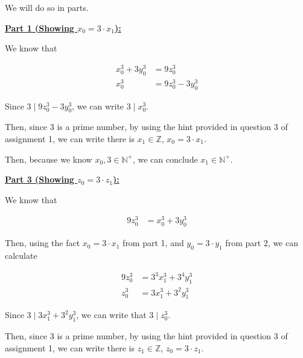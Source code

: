 \documentclass[12pt]{article}
\begin{document}
\begin{mdframed}
\begin{enumerate}[1.]
\begin{mdframed}
        \bigskip

        We will do so in parts.

        \bigskip

        \underline{\textbf{Part 1 (Showing $x_0 = 3 \cdot x_1$):}}

        \bigskip

        We know that

        \begin{align}
            x_0^3 + 3y_0^3 &= 9z_0^3\\
            x_0^3 &= 9z_0^3 - 3y_0^3
        \end{align}

        \bigskip

        Since $3 \mid 9z_0^3 - 3y_0^3$, we can write $3 \mid x_0^3$.

        \bigskip

        Then, since 3 is a prime number, by using the hint provided in question 3
        of assignment 1, we can write there is $x_1 \in \mathbb{Z}$, $x_0 = 3 \cdot x_1$.

        \bigskip

        Then, because we know $x_0, 3 \in \mathbb{N}^+$, we can conclude
        $x_1 \in \mathbb{N}^+$.

        \bigskip

        \underline{\textbf{Part 3 (Showing $z_0 = 3 \cdot z_1$):}}

        \bigskip

        We know that

        \begin{align}
            9z_0^3 &= x_0^3 + 3y_0^3
        \end{align}

        \bigskip

        Then, using the fact $x_0 = 3 \cdot x_1$ from part 1, and
        $y_0 = 3 \cdot y_1$ from part 2, we can calculate

        \begin{align}
            9z_0^3 &= 3^3x_1^3 + 3^4y_1^3\\
            z_0^3 &= 3x_1^3 + 3^2y_1^3
        \end{align}

        \bigskip

        Since $3 \mid 3x_1^3 + 3^2y_1^3$, we can write that $3 \mid z_0^3$.

        \bigskip

        Then, since 3 is a prime number, by using the hint provided in question 3
        of assignment 1, we can write there is $z_1 \in \mathbb{Z}$, $z_0 = 3 \cdot z_1$.


\end{mdframed}
\end{enumerate}
\end{mdframed}
\end{document}
